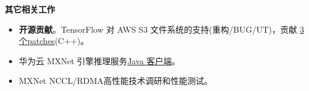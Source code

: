 \documentclass{resume}
\begin{document}
\begin{onehalfspacing}
\textbf{其它相关工作}  
\begin{itemize}%
  \item \textbf{开源贡献}。TensorFlow 对 AWS S3 文件系统的支持(重构/BUG/UT)，贡献 \href{https://github.com/tensorflow/tensorflow/pull/11089#issuecomment-320258536}{3 个patches}(C++)。
  \item 华为云 MXNet 引擎推理服务\href{https://github.com/huawei-clouds/dls-mxserving-client/tree/master/java}{Java 客户端}。
  \item MXNet NCCL/RDMA高性能技术调研和性能测试。
\end{itemize}
\end{onehalfspacing}
\end{document}
